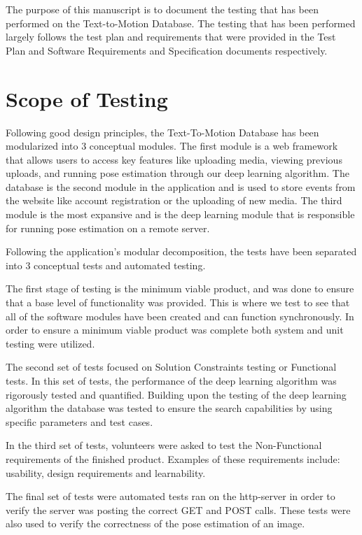 \documentclass{scrreprt}
\begin{document}
The purpose of this manuscript is to document the testing that has been
performed on the Text-to-Motion Database. The testing that has been
performed largely follows the test plan and requirements that were provided in the Test Plan and Software Requirements and Specification documents respectively.

\section{Scope of Testing}

Following good design principles, the Text-To-Motion Database has been modularized into $3$ conceptual modules.  The first module is a web framework that allows users to access key features like uploading media, viewing previous uploads, and running pose estimation through our deep learning algorithm. The database is the second module in the application and is used to store events from the website like account registration or the uploading of new media. The third module is the most expansive and is the deep learning module that is responsible for running pose estimation on a remote server.

Following the application's modular decomposition, the tests have been separated into $3$ conceptual tests and automated testing.

The first stage of testing is the minimum viable product, and was done to ensure that a base level of functionality was provided. This is where we test to see that all of the software modules have been created and can function synchronously. In order to ensure a minimum viable product was complete both system and unit testing were utilized.

The second set of tests focused on Solution Constraints testing or Functional tests.  In this set of tests, the performance of the deep learning algorithm was rigorously tested and quantified. Building upon the testing of the deep learning algorithm the database was tested to ensure the search capabilities by using specific parameters and test cases.

In the third set of tests, volunteers were asked to test the Non-Functional requirements of the finished product. Examples of these requirements include: usability, design requirements and learnability.

The final set of tests were automated tests ran on the http-server in order to verify the server was posting the correct GET and POST calls. These tests were also used to verify the correctness of the pose estimation of an image.
\end{document}
